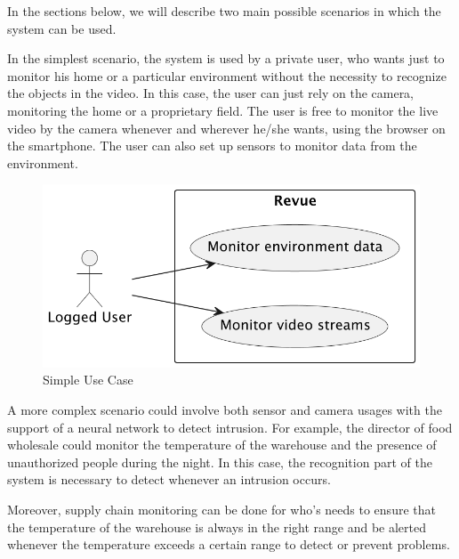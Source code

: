 \documentclass{scrartcl}
\begin{document}
    In the sections below, we will describe two main possible scenarios in which the system can be used.

    In the simplest scenario, the system is used by a private user, who wants just to monitor his home or a particular
    environment without the necessity to recognize the objects in the video.
    In this case, the user can just rely on the camera, monitoring the home or a proprietary field.
    The user is free to monitor the live video by the camera whenever and wherever he/she wants, using the browser on the smartphone.
    The user can also set up sensors to monitor data from the environment.

    \begin{figure}
        \centering
        \includegraphics[scale=0.6]{img/simple-use-case}
        \caption{Simple Use Case}
        \label{fig:simple-use-case}
    \end{figure}

    A more complex scenario could involve both sensor and camera usages with the support of a neural network to detect intrusion.
    For example, the director of food wholesale could monitor the temperature of the warehouse and the presence of unauthorized people during the night.
    In this case, the recognition part of the system is necessary to detect whenever an intrusion occurs.

    Moreover, supply chain monitoring can be done for who's needs to ensure that the temperature of
    the warehouse is always in the right range and be alerted whenever the temperature exceeds a certain range to detect or
    prevent problems.
\end{document}
